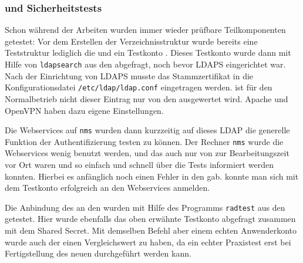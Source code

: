 \documentclass[11pt,a4paper,titlepage=firstiscover]{scrartcl} %
\begin{document}
\subsubsection{ und Sicherheitstests}
Schon während der Arbeiten wurden immer wieder prüfbare Teilkomponenten getestet: 
Vor dem Erstellen der Verzeichnisstruktur wurde bereits eine Teststruktur 
  lediglich die  
 und ein Testkonto . Dieses Testkonto 
wurde dann mit Hilfe von \texttt{ldapsearch} aus den  abgefragt, 
 noch bevor LDAPS eingerichtet war. Nach der 
Einrichtung von LDAPS musste das Stammzertifikat in die Konfigurationsdatei 
\texttt{/etc/ldap/ldap.conf} eingetragen werden.  ist 
 für den Normalbetrieb nicht  dieser 
Eintrag nur von den  ausgewertet wird. Apache und OpenVPN haben 
dazu eigene Einstellungen. 

Die Webservices auf \texttt{nms} wurden dann kurzzeitig auf dieses LDAP 
 die generelle Funktion der Authentifizierung testen zu 
können. Der Rechner \texttt{nms} wurde  die Webservices 
 wenig benutzt werden, und das auch nur von 
 zur Bearbeitungszeit vor Ort waren und so einfach und 
schnell über die Tests informiert werden konnten. Hierbei    es anfänglich noch einen Fehler in den 
 gab.   konnte man sich mit 
dem Testkonto erfolgreich an den Webservices anmelden.

Die Anbindung des  an den  wurden 
mit Hilfe des Programms \texttt{radtest} aus den  
getestet. Hier wurde ebenfalls das oben erwähnte Testkonto abgefragt zusammen 
mit dem Shared Secret.  Mit demselben Befehl 
\tcr{($\to$,} aber einem echten Anwenderkonto \tcr{)$\to$,} wurde auch der 
  einen Vergleichswert zu haben, da 
ein echter Praxistest erst bei Fertigstellung des neuen  
durchgeführt werden kann.
\end{document}
